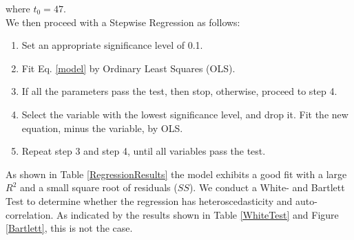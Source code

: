 \documentclass[10pt]{article}
\begin{document}
 where $t_0=47$.\\
  
We then proceed with a Stepwise Regression \cite{Draper1998} as follows: \\
 
 \begin{enumerate}
	\item Set an appropriate significance level of 0.1.\\
	\item Fit Eq. \ref{model} by Ordinary Least Squares (OLS).\\
	\item If all the parameters pass the test, then stop, otherwise, proceed to step 4.\\
	\item Select the variable with the lowest significance level, and drop it. Fit the new equation, minus the variable, by OLS.\\
	\item Repeat step 3 and step 4, until all variables pass the test.
\end{enumerate}
 
As shown in Table \ref{RegressionResults} the model exhibits a good fit with a large $R^2$ and a small square root of residuals ($SS$). We conduct a White- and Bartlett Test \cite{Bartlett1937,White1980} to determine whether the regression has heteroscedasticity and auto-correlation. As indicated by the results shown in Table \ref{WhiteTest} and Figure \ref{Bartlett}, this is not the case.\\
 
\end{document}
